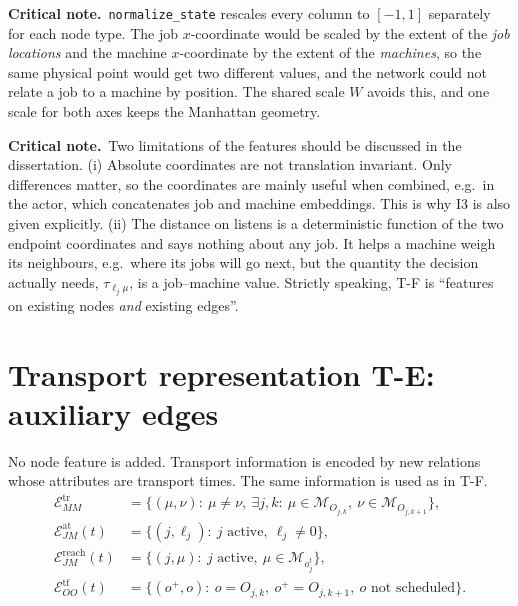\documentclass[11pt,a4paper]{article}
\newcommand{\Mset}{\mathcal{M}}
\newcommand{\Eset}{\mathcal{E}}
\newcommand{\loc}{\ell}
\newcommand{\crit}[1]{\par\smallskip\noindent\textbf{Critical note.}\ #1\par\smallskip}
\begin{document}
\crit{\texttt{normalize\_state} rescales every column to $[-1,1]$ separately
for each node type. The job $x$-coordinate would be scaled by the extent of the
\emph{job locations} and the machine $x$-coordinate by the extent of the
\emph{machines}, so the same physical point would get two different values, and
the network could not relate a job to a machine by position. The shared scale
$W$ avoids this, and one scale for both axes keeps the Manhattan geometry.}

\crit{Two limitations of the features should be discussed in the dissertation.
(i) Absolute coordinates are not translation invariant. Only differences matter,
so the coordinates are mainly useful when combined, e.g.\ in the actor, which
concatenates job and machine embeddings. This is why I3 is also given
explicitly. (ii) The distance on \textsf{listens} is a deterministic function of
the two endpoint coordinates and says nothing about any job. It helps a machine
weigh its neighbours, e.g.\ where its jobs will go next, but the quantity the
decision actually needs, $\tau_{\loc_j\mu}$, is a job--machine value. Strictly
speaking, T-F is ``features on existing nodes \emph{and} existing edges''.}

\section{Transport representation T-E: auxiliary edges}
\label{sec:repTE}

No node feature is added. Transport information is encoded by new relations
whose attributes are transport times. The same information is used as in T-F.
\begin{align}
  \Eset_{MM}^{\mathrm{tr}} &= \{(\mu,\nu):\ \mu\neq\nu,\ \exists j,k:\ \mu\in\Mset_{O_{j,k}},\ \nu\in\Mset_{O_{j,k+1}}\},
  \label{eq:Etr}\\
  \Eset_{JM}^{\mathrm{at}}(t) &= \{(j,\loc_j):\ j \text{ active},\ \loc_j\neq 0\},
  \label{eq:Eat}\\
  \Eset_{JM}^{\mathrm{reach}}(t) &= \{(j,\mu):\ j \text{ active},\ \mu\in\Mset_{o_j^t}\},
  \label{eq:Ereach}\\
  \Eset_{OO}^{\mathrm{tf}}(t) &= \{(o^+,o):\ o=O_{j,k},\ o^+=O_{j,k+1},\ o \text{ not scheduled}\}.
  \label{eq:Etf}
\end{align}
\end{document}
